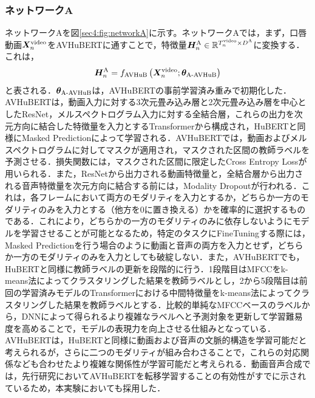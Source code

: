 \subsubsection{ネットワークA}
ネットワークAを図\ref{sec4:fig:networkA}に示す。ネットワークAでは，まず，口唇動画$\bm{X}^{\text{video}}_{n}$をAVHuBERTに通すことで，特徴量$\bm{H}^{\text{A}}_{n} \in \mathbb{R}^{T^{\text{video}}_{n} \times D^{\text{A}}}$に変換する．これは，
\begin{equation}
    \bm{H}^{\text{A}}_{n} = f_{\text{AVHuB}}\left(\bm{X}^{\text{video}}_{n}; \bm{\theta}_{\text{A-AVHuB}}\right)
\end{equation}
と表される．$\bm{\theta}_{\text{A-AVHuB}}$は，AVHuBERTの事前学習済み重みで初期化した．AVHuBERTは，動画入力に対する3次元畳み込み層と2次元畳み込み層を中心としたResNet，メルスペクトログラム入力に対する全結合層，これらの出力を次元方向に結合した特徴量を入力とするTransformerから構成され，HuBERTと同様にMasked Predictionによって学習される．AVHuBERTでは，動画およびメルスペクトログラムに対してマスクが適用され，マスクされた区間の教師ラベルを予測させる．損失関数には，マスクされた区間に限定したCross Entropy Lossが用いられる．また，ResNetから出力される動画特徴量と，全結合層から出力される音声特徴量を次元方向に結合する前には，Modality Dropoutが行われる．これは，各フレームにおいて両方のモダリティを入力とするか，どちらか一方のモダリティのみを入力とする（他方を0に置き換える）かを確率的に選択するものである．これにより，どちらかの一方のモダリティのみに依存しないようにモデルを学習させることが可能となるため，特定のタスクにFineTuningする際には，Masked Predictionを行う場合のように動画と音声の両方を入力とせず，どちらか一方のモダリティのみを入力としても破綻しない．また，AVHuBERTでも，HuBERTと同様に教師ラベルの更新を段階的に行う．1段階目はMFCCをk-means法によってクラスタリングした結果を教師ラベルとし，2から5段階目は前回の学習済みモデルのTransformerにおける中間特徴量をk-means法によってクラスタリングした結果を教師ラベルとする．比較的単純なMFCCベースのラベルから，DNNによって得られるより複雑なラベルへと予測対象を更新して学習難易度を高めることで，モデルの表現力を向上させる仕組みとなっている．AVHuBERTは，HuBERTと同様に動画および音声の文脈的構造を学習可能だと考えられるが，さらに二つのモダリティが組み合わさることで，これらの対応関係なども合わせたより複雑な関係性が学習可能だと考えられる．動画音声合成では，先行研究においてAVHuBERTを転移学習することの有効性がすでに示されているため，本実験においても採用した．

